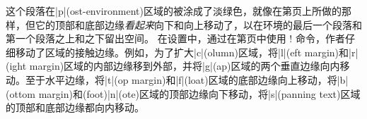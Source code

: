 这个段落在|p|(ost-environment)区域的\bground{}被涂成了淡绿色，就像在第\pageref{page:bgpaint4}页上所做的那样，但它的顶部和底部边缘\emph{看起来}向下和向上移动了，以在环境的最后一个段落和第一个段落之上和之下留出空间。
% 
% 
% 
% 
在设置中，通过在第\Tie\pageref{sec:bgpaint-me}页中使用 \!\backgroundcolor! 命令，作者仔细移动了区域的接触边缘。例如，为了扩大|c|(olumn)区域，将|l|(eft margin)和|r|(ight margin)区域的内部边缘移到外部，并将|g|(ap)区域的两个垂直边缘向内移动。至于水平边缘，将|t|(op margin)和|f|(loat)区域的底部边缘向上移动，将|b|(ottom margin)和(foot)|n|(ote)区域的顶部边缘向下移动，将|s|(panning text)区域的顶部和底部边缘都向内移动。


